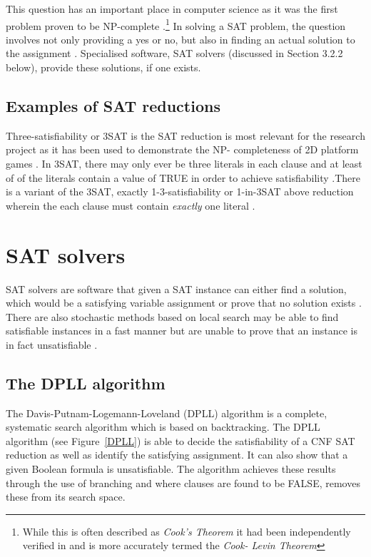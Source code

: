 \documentclass[11pt, a4paper, oneside]{report} %
\begin{document}
This question has an important place in computer science as it was the first
problem proven to be NP-complete \cite{cook1971complexity}.\footnote{While this
is often described as \textit{Cook's Theorem} it had been independently verified
in \cite{levin1973universal} and is more accurately termed the \textit{Cook-
Levin Theorem}} In solving a SAT problem, the question involves not only
providing a yes or no, but also in finding an actual solution to the assignment
\cite{zhang2002quest}. Specialised software, SAT solvers (discussed in Section
3.2.2 below), provide these solutions, if one exists.

\subsection{Examples of SAT reductions}

Three-satisfiability or 3SAT is the SAT reduction is most relevant for the
research project as it has been used to demonstrate the NP- completeness of 2D
platform games  \cite{Aloupis2012}. In 3SAT, there may only ever be three
literals in each clause and at least of of the literals contain a value of TRUE
in order to achieve satisfiability \cite{balyo2010solving}.There is a variant of
the 3SAT, exactly 1-3-satisfiability or 1-in-3SAT above reduction wherein the
each clause must contain \textit{exactly} one literal \cite{balyo2010solving,
du2011theory}.


\section{SAT solvers}

SAT solvers are software that given a SAT instance can either find a solution,
which would be a satisfying variable assignment or prove that no solution exists
\cite{zhang2002quest}. There are also stochastic methods based on local search
may be able to find satisfiable instances in a fast manner but are unable to
prove that an instance is in fact unsatisfiable \cite{gomes2008satisfiability}.


\subsection{The DPLL algorithm}

The Davis-Putnam-Logemann-Loveland (DPLL) algorithm \cite{davis1962machine} is a
complete, systematic search algorithm which is based on backtracking. The DPLL
algorithm (see Figure~\ref{DPLL}) is able to decide the satisfiability of a CNF
SAT reduction as well as identify the satisfying assignment. It can also show
that a given Boolean formula is unsatisfiable. The algorithm achieves these
results through the use of branching and where clauses are found to be FALSE,
removes these from its search space.
\end{document}
